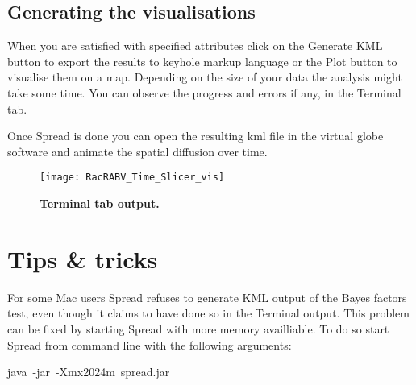 \subsection{Generating the visualisations}

When you are satisfied with specified attributes click on the Generate
KML button to export the results to keyhole markup language or the
Plot button to visualise them on a map. Depending on the size of your
data the analysis might take some time. You can observe the progress
and errors if any, in the Terminal tab.

Once Spread is done you can open the resulting kml file in the virtual
globe software and animate the spatial diffusion over time.

\begin{figure}[H]
\begin{centering}
\texttt{[image: RacRABV\_Time\_Slicer\_vis]}
\caption{
{ \footnotesize 
{\bf Terminal tab output.}
} %
}
\label{fig:12}
\par\end{centering}
\end{figure}

\section{Tips \& tricks}

For some Mac users Spread refuses to generate KML output of the Bayes
factors test, even though it claims to have done so in the Terminal
output. This problem can be fixed by starting Spread with more memory
availliable. To do so start Spread from command line with the following
arguments: 

\begin{lyxcode}
java~-jar~-Xmx2024m~spread.jar
\end{lyxcode}
